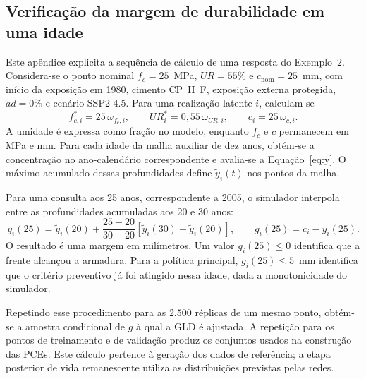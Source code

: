 \renewcommand\theequation{\Alph{section}\arabic{equation}}
\renewcommand\thefigure{\Alph{section}\arabic{figure}}
\renewcommand\thetable{\Alph{section}\arabic{table}}

\begin{appendices}

\renewcommand{\thesection}{Ap\^endice \Alph{section}}
\renewcommand{\thesubsection}{\Alph{section}.\arabic{subsection}}

\section{Verificação da margem de durabilidade em uma idade}
\label{app:exemplo_passo}

Este apêndice explicita a sequência de cálculo de uma resposta do Exemplo~2. Considera-se o ponto nominal $f_c=25$~MPa, $UR=55\%$ e $c_{\mathrm{nom}}=25$~mm, com início da exposição em 1980, cimento CP~II~F, exposição externa protegida, $ad=0\%$ e cenário SSP2-4.5. Para uma realização latente $i$, calculam-se
\begin{equation}
    f_{c,i}^{\ast}=25\,\omega_{f_c,i},\qquad
    UR_i^{\ast}=0{,}55\,\omega_{UR,i},\qquad
    c_i=25\,\omega_{c,i}.
\end{equation}
A umidade é expressa como fração no modelo, enquanto $f_c$ e $c$ permanecem em MPa e mm. Para cada idade da malha auxiliar de dez anos, obtém-se a concentração no ano-calendário correspondente e avalia-se a Equação~\eqref{eq:y}. O máximo acumulado dessas profundidades define $\tilde{y}_i(t)$ nos pontos da malha.

Para uma consulta aos 25 anos, correspondente a 2005, o simulador interpola entre as profundidades acumuladas aos 20 e 30 anos:
\begin{equation}
    y_i(25)=\tilde{y}_i(20)+\frac{25-20}{30-20}
    \left[\tilde{y}_i(30)-\tilde{y}_i(20)\right],\qquad
    g_i(25)=c_i-y_i(25).
\end{equation}
O resultado é uma margem em milímetros. Um valor $g_i(25)\leq0$ identifica que a frente alcançou a armadura. Para a política principal, $g_i(25)\leq5$~mm identifica que o critério preventivo já foi atingido nessa idade, dada a monotonicidade do simulador.

Repetindo esse procedimento para as $2.500$ réplicas de um mesmo ponto, obtém-se a amostra condicional de $g$ à qual a GLD é ajustada. A repetição para os pontos de treinamento e de validação produz os conjuntos usados na construção das PCEs. Este cálculo pertence à geração dos dados de referência; a etapa posterior de vida remanescente utiliza as distribuições previstas pelas redes.


\end{appendices}
